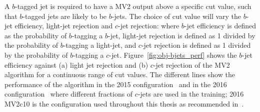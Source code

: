 A $b$-tagged jet is required to have a MV2 output above a specific cut value, such that $b$-tagged jets are likely to be $b$-jets.
The choice of cut value will vary the $b$-jet efficiency, light-jet rejection and $c$-jet rejection: where
$b$-jet efficiency is defined as the probability of $b$-tagging a $b$-jet,
light-jet rejection is defined as 1 divided by the probability of $b$-tagging a light-jet, and
$c$-jet rejection is defined as  1 divided by the probability of $b$-tagging a $c$-jet.
Figure~\ref{fig:obj-bjets_perf} shows the $b$-jet efficiency against (a) light jet rejection and (b) $c$-jet rejection of the MV2 algorithm for a continuous range of cut values.
The different lines show the performance of the algorithm in the 2015 configuration~\cite{obj-bjets_algo_2015}
and in the 2016 configuration~\cite{obj-bjets_algo_2016} where different fractions of $c$-jets are used in the training;
2016 MV2c10 is the configuration used throughout this thesis as recommended in~\cite{obj-bjets_algo_2016}.
    
